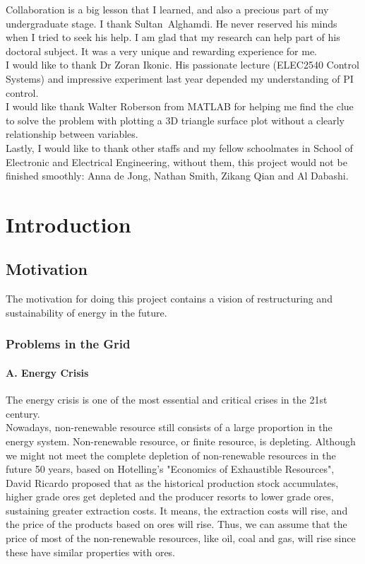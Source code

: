\documentclass{report}
\begin{document}
Collaboration is a big lesson that I learned, and also a precious part of my undergraduate stage. I thank Sultan Alghamdi. He never reserved his minds when I tried to seek his help. I am glad that my research can help part of his doctoral subject. It was a very unique and rewarding experience for me.\\

I would like to thank Dr Zoran Ikonic. His passionate lecture (ELEC2540 Control Systems) and impressive experiment last year depended my understanding of PI control.\\

I would like thank Walter Roberson from MATLAB for helping me find the clue to solve the problem with plotting a 3D triangle surface plot without a clearly relationship between variables.\\

Lastly, I would like to thank other staffs and my fellow schoolmates in School of Electronic and Electrical Engineering, without them, this project would not be finished smoothly: Anna de Jong, Nathan Smith, Zikang Qian and Al Dabashi.\\



\afterpreface


\chapter{Introduction}
\section{Motivation} %
The motivation for doing this project contains a vision of restructuring and sustainability of energy in the future.
\subsection{Problems in the Grid}
\subsubsection{A. Energy Crisis}
The energy crisis is one of the most essential and critical crises in the 21st century.\\

Nowadays, non-renewable resource still consists of a large proportion in the energy system. Non-renewable resource, or finite resource, is depleting. Although we might not meet the complete depletion of non-renewable resources in the future 50 years, based on Hotelling’s "Economics of Exhaustible Resources", David Ricardo proposed that as the historical production stock accumulates, higher grade ores get depleted and the producer resorts to lower grade ores, sustaining greater extraction costs. It means, the extraction costs will rise, and the price of the products based on ores will rise. Thus, we can assume that the price of most of the non-renewable resources, like oil, coal and gas, will rise since these have similar properties with ores.\\
\end{document}
